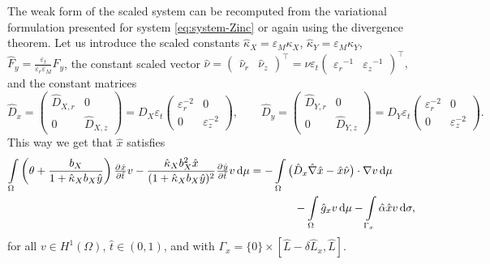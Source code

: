 \documentclass[a4paper,doc,11pt]{article}
\begin{document}
The weak form of the scaled system can be recomputed from the variational formulation presented for system \eqref{eq:system-Zinc} or again using the divergence theorem. %
Let us introduce the scaled constants 
\(\hat{\kappa}_X = \varepsilon_M \kappa_X\), \(\hat{\kappa}_Y = \varepsilon_M \kappa_Y\), \(\hat{F}_y = \frac{\varepsilon_t}{\varepsilon_r \varepsilon_M} F_y \),
the constant scaled vector 
\(
    \hat{\nu} = 
    (\begin{smallmatrix}
        \hat{\nu}_r
        &
        \hat{\nu}_z
    \end{smallmatrix})^\top
    =
    \nu \varepsilon_t
    (\begin{smallmatrix}
        {\varepsilon_r}^{-1}
        &
        {\varepsilon_z}^{-1}
    \end{smallmatrix})^\top,
\) 
and the constant matrices
\[
    \hat{D}_x = 
    \begin{pmatrix}
         \hat{D}_{X,r} & 0 
         \\
        0 &  \hat{D}_{X,z}
    \end{pmatrix}
    =
    D_X \varepsilon_t
    \begin{pmatrix}
         \varepsilon_r^{-2} & 0 
         \\
        0 &  \varepsilon_z^{-2}
    \end{pmatrix}
    ,\qquad
    \hat{D}_y = 
    \begin{pmatrix}
         \hat{D}_{Y,r} & 0 
         \\
        0 &  \hat{D}_{Y,z}
    \end{pmatrix}
    =
    D_Y \varepsilon_t
    \begin{pmatrix}
         \varepsilon_r^{-2} & 0 
         \\
        0 &  \varepsilon_z^{-2}
    \end{pmatrix}.
\]
This way we get that \( \hat{x}\) satisfies
\begin{equation}
\label{eq:non-dim-x}
\begin{aligned}
    \int\limits_\Omega
    \left( \theta + \frac{b_X}{1 + \hat{\kappa}_X b_X \hat{y}} \right)  \pd{\hat{x}}{\hat{t}} v 
    -
    \frac{\hat{\kappa}_X b_X^2 \hat{x}}{(1+\hat{\kappa}_X b_X \hat{y})^2} \pd{\hat y}{\hat t} v
    \dif\mu
    &=
    -\int\limits_\Omega 
    \big( \hat{D}_x \hat{\nabla} \hat{x} - \hat{x}\hat{\nu}\big) \cdot \nabla v \dif\mu
    \\
    &\qquad\qquad
    -\int\limits_\Omega \hat{g}_x v \dif\mu
    -\int\limits_{\Gamma_{x}}    \hat{\alpha} \hat{x} v    \dif \sigma,
\end{aligned}
\end{equation}
for all \( v\in H^1 (\Omega)\), \(\hat{t}\in (0,1)\), and
with $\Gamma_{x} = \{0\}\times [\hat{L}-\delta \hat{L}_x,\hat{L}]$.
\end{document}
